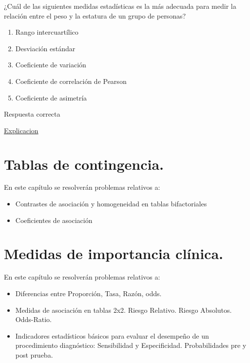 \documentclass[
]{book}
\providecommand{\tightlist}{%
  \setlength{\itemsep}{0pt}\setlength{\parskip}{0pt}}
\begin{document}
¿Cuál de las siguientes medidas estadísticas es la más adecuada para medir la relación entre el peso y la estatura de un grupo de personas?

\begin{enumerate}
\def\labelenumi{\alph{enumi})}
\tightlist
\item
  Rango intercuartílico
\item
  Desviación estándar
\item
  Coeficiente de variación
\item
  Coeficiente de correlación de Pearson
\item
  Coeficiente de asimetría
\end{enumerate}

Respuesta correcta

\href{https://1fjmanzano.github.io/bioestadistica/relaci\%C3\%B3n-entre-variables-nume\%CC\%81ricas.html\#coeficiente-de-correlacio\%CC\%81n}{Explicacion}

\hypertarget{tablas-de-contingencia.}{%
\chapter{Tablas de contingencia.}\label{tablas-de-contingencia.}}

En este capítulo se resolverán problemas relativos a:

\begin{itemize}
\tightlist
\item
  Contrastes de asociación y homogeneidad en tablas bifactoriales
\item
  Coeficientes de asociación
\end{itemize}

\hypertarget{medidas-de-importancia-cluxednica.}{%
\chapter{Medidas de importancia clínica.}\label{medidas-de-importancia-cluxednica.}}

En este capítulo se resolverán problemas relativos a:

\begin{itemize}
\tightlist
\item
  Diferencias entre Proporción, Tasa, Razón, odds.
\item
  Medidas de asociación en tablas 2x2. Riesgo Relativo. Riesgo Absolutos. Odds-Ratio.
\item
  Indicadores estadísticos básicos para evaluar el desempeño de un procedimiento diagnóstico: Sensibilidad y Especificidad. Probabilidades pre y post prueba.
\end{itemize}
\end{document}
